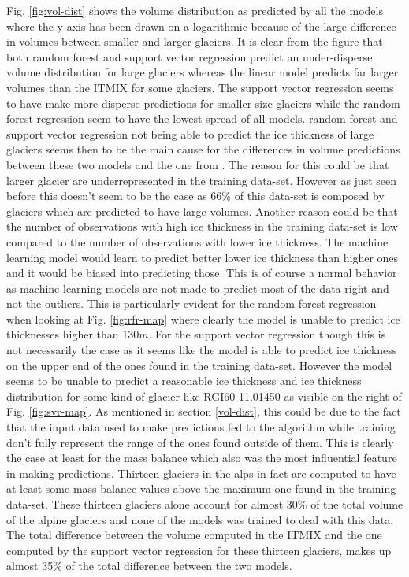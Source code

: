 Fig. \ref{fig:vol-dist} shows the volume distribution as predicted by all the models where the y-axis has been drawn on a logarithmic because of the large difference in volumes between smaller and larger glaciers. It is clear from the figure that both random forest and support vector regression predict an under-disperse volume distribution for large glaciers whereas the linear model predicts far larger volumes than the ITMIX for some glaciers. The support vector regression seems to have make more disperse predictions for smaller size glaciers while the random forest regression seem to have the lowest spread of all models.
random forest and support vector regression not being able to predict the ice thickness of large glaciers seems then to be the main cause for the differences in volume predictions between these two models and the one from \citet{Farinotti2019}.
The reason for this could be that larger glacier are underrepresented in the training data-set. However as just seen before this doesn't seem to be the case as 66\% of this data-set is composed by glaciers which are predicted to have large volumes.
Another reason could be that the number of observations with high ice thickness in the training data-set is low compared to the number of observations with lower ice thickness. The machine learning model would learn to predict better lower ice thickness than higher ones and it would be biased into predicting those. This is of course a normal behavior as machine learning models are not made to predict most of the data right and not the outliers. This is particularly evident for the random forest regression when looking at Fig. \ref{fig:rfr-map} where clearly the model is unable to predict ice thicknesses higher than 130$m$.
For the support vector regression though this is not necessarily the case as it seems like the model is able to predict ice thickness on the upper end of the ones found in the training data-set. However the model seems to be unable to predict a reasonable ice thickness and ice thickness distribution for some kind of glacier like RGI60-11.01450 as visible on the right of Fig. \ref{fig:svr-map}. As mentioned in section \ref{vol-dist}, this could be due to the fact that the input data used to make predictions fed to the algorithm while training don't fully represent the range of the ones found outside of them. This is clearly the case at least for the mass balance which also was the most influential feature in making predictions. Thirteen glaciers in the alps in fact are computed to have at least some mass balance values above the maximum one found in the training data-set. These thirteen glaciers alone account for almost 30\% of the total volume of the alpine glaciers and none of the models was trained to deal with this data. The total difference between the volume computed in the ITMIX and the one computed by the support vector regression for these thirteen glaciers, makes up almost 35\% of the total difference between the two models. 
